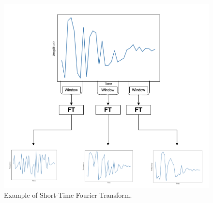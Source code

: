 \documentclass{turabian-thesis}[12pt]
\begin{document}
\begin{figure}[h]
   \begin{center}
      \includegraphics[scale=0.6]{../media/stft.png}
   \end{center}
   \caption{Example of Short-Time Fourier Transform.}
   \label{fig:stft_example}
\end{figure}

\end{document}
